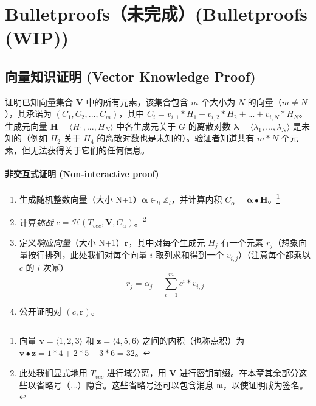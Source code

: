 \chapter{Bulletproofs（未完成）(Bulletproofs (WIP))}
\label{chapter:bulletproofs}


\section{向量知识证明 (Vector Knowledge Proof)}
\label{sec:vectorzkproof}

证明已知向量集合 $\boldsymbol{V}$ 中的所有元素，该集合包含 $m$ 个大小为 $N$ 的向量（$m \neq N$），其承诺为 $(C_1, C_2,..., C_m)$，其中 $C_i = v_{i,1}*H_1 + v_{i,2}*H_2 + ... + v_{i,N}*H_N$。生成元向量 $\boldsymbol{H} = \langle H_1,..., H_N \rangle$ 中各生成元关于 $G$ 的离散对数 $\boldsymbol{\lambda} = \langle \lambda_1, ..., \lambda_N \rangle$ 是未知的（例如 $H_2$ 关于 $H_4$ 的离散对数也是未知的）。验证者知道共有 $m*N$ 个元素，但无法获得关于它们的任何信息。

\subsubsection*{非交互式证明 (Non-interactive proof)}

\begin{enumerate}
	\item 生成随机整数向量（大小 N+1）\(\boldsymbol{\alpha} \in_R \mathbb{Z}_l\)，并计算内积 $C_{\alpha} = \boldsymbol{\alpha} \bullet \textbf{H}$。\footnote{向量 \(\boldsymbol{v} = \langle 1, 2, 3 \rangle\) 和 \(\boldsymbol{z} = \langle 4, 5, 6 \rangle\) 之间的内积（也称点积）为 \(\boldsymbol{v} \bullet \boldsymbol{z} = 1*4 + 2*5 + 3*6 = 32\)。}
	\item 计算{\em 挑战} $c = \mathcal{H}(T_{vec},\boldsymbol{V},C_{\alpha})$。\footnote{此处我们显式地用 $T_{vec}$ 进行域分离，用 $\boldsymbol{V}$ 进行密钥前缀。在本章其余部分这些以省略号（...）隐含。这些省略号还可以包含消息 $\mathfrak{m}$，以使证明成为签名。}
	\item 定义{\em 响应向量}（大小 N+1）$\textbf{r}$，其中对每个生成元 $H_j$ 有一个元素 $r_j$（想象向量按行排列，此处我们对每个向量 $i$ 取列求和得到一个 $v_{i,j}$）（注意每个都乘以 $c$ 的 $i$ 次幂）
	\[r_j = \alpha_j - \sum^{m}_{i=1} c^i*v_{i,j}\]
	\item 公开证明对 $(c, \boldsymbol{r})$。
\end{enumerate}


